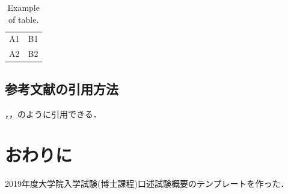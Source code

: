 \documentclass[twocolumn]{d-abst}
\begin{document}
\begin{table}[tbh]
 \begin{center}
  \begin{tabular}{|l|r|} \hline
  A1 & B1 \\
  A2 & B2 \\ \hline
  \end{tabular}
  \caption{Example of table.}
  \label{table:sample}
 \end{center}
\end{table}

\subsection{参考文献の引用方法}

\cite{launder1975progress}，\cite{mitsuishi1992user}，\cite{mitsuishi1995neural,timoshenko1962theory}のように引用できる．

\section{おわりに}

2019年度大学院入学試験(博士課程)口述試験概要のテンプレートを作った．



\end{document}
